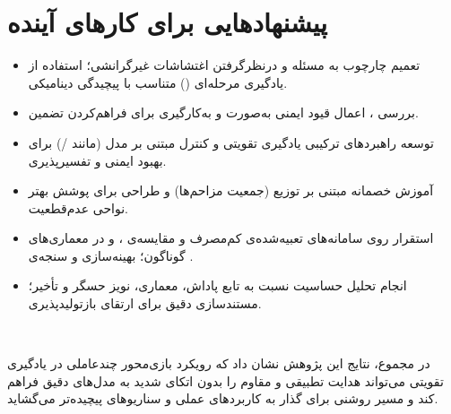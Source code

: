 
\section*{پیشنهادهایی برای کارهای آینده}
\begin{itemize}
	\item تعمیم چارچوب به مسئله  و درنظرگرفتن اغتشاشات غیرگرانشی؛ استفاده از یادگیری مرحله‌ای () متناسب با پیچیدگی دینامیکی.
	\item بررسی ، اعمال قیود ایمنی به‌صورت  و به‌کارگیری 
	 برای فراهم‌کردن تضمین.
	\item توسعه راهبردهای ترکیبی یادگیری تقویتی و کنترل مبتنی بر مدل (مانند /) برای بهبود ایمنی و تفسیرپذیری.
	\item آموزش خصمانه مبتنی بر توزیع (جمعیت مزاحم‌ها) و طراحی  برای پوشش بهتر نواحی عدم‌قطعیت.
	\item استقرار روی سامانه‌های تعبیه‌شده‌ی کم‌مصرف و مقایسه‌ی ،  و  در معماری‌های گوناگون؛ بهینه‌سازی  و سنجه‌ی .
	\item انجام تحلیل حساسیت نسبت به تابع پاداش، معماری، نویز حسگر و تأخیر؛ مستندسازی دقیق برای ارتقای بازتولیدپذیری.
\end{itemize}
       

\vspace{0.5em}
در مجموع، نتایج این پژوهش نشان داد که رویکرد بازی‌محور چندعاملی در یادگیری تقویتی می‌تواند هدایت تطبیقی و مقاوم را بدون اتکای شدید به مدل‌های دقیق فراهم کند و مسیر روشنی برای گذار به کاربردهای عملی و سناریوهای پیچیده‌تر می‌گشاید.

